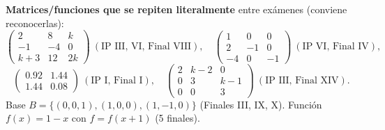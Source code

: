 \begin{truco}
\textbf{Matrices/funciones que se repiten literalmente} entre exámenes (conviene reconocerlas):
\[
\begin{pmatrix}2&8&k\\-1&-4&0\\k+3&12&2k\end{pmatrix}\ (\text{IP III, VI, Final VIII}),\quad
\begin{pmatrix}1&0&0\\2&-1&0\\-4&0&-1\end{pmatrix}\ (\text{IP VI, Final IV}),
\]
\[
\begin{pmatrix}0.92&1.44\\1.44&0.08\end{pmatrix}\ (\text{IP I, Final I}),\quad
\begin{pmatrix}2&k-2&0\\0&3&k-1\\0&0&3\end{pmatrix}\ (\text{IP III, Final XIV}).
\]
Base $B=\{(0,0,1),(1,0,0),(1,-1,0)\}$ (Finales III, IX, X). Función $f(x)=1-x$ con $f=f(x+1)$ (5 finales).
\end{truco}

\newpage
